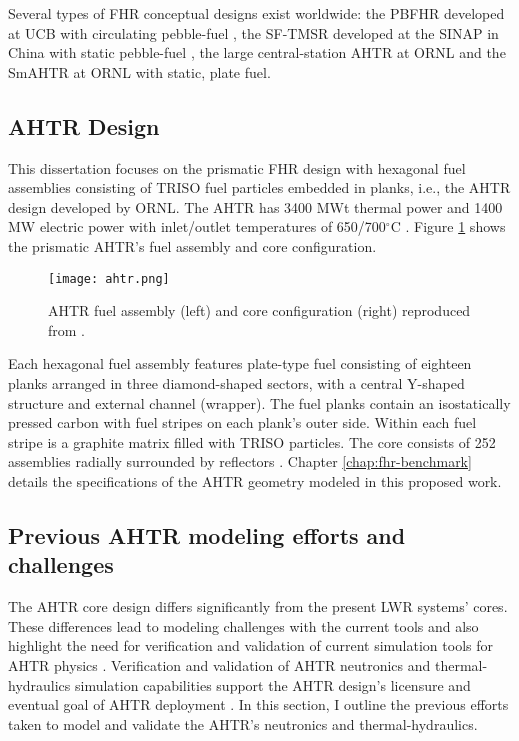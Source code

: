 Several types of \gls{FHR} conceptual designs exist worldwide: the \gls{PBFHR} 
developed at \gls{UCB} with circulating pebble-fuel 
\cite{scarlat_current_2014,krumwiede_three-dimensional_2013}, the \gls{SF-TMSR} 
developed at the \gls{SINAP} in China with static pebble-fuel \cite{liu_preliminary_2016}, 
the large central-station \gls{AHTR} at \gls{ORNL} \cite{holcomb_core_2011, varma_ahtr_2012} and 
the \gls{SmAHTR} at ORNL \cite{greene_pre-conceptual_2010} with static, plate fuel. 

\subsection{\acrlong{AHTR} Design}
This dissertation focuses on the prismatic \gls{FHR} design with hexagonal fuel 
assemblies consisting of \gls{TRISO} fuel particles embedded in planks, i.e., 
the \gls{AHTR} design developed by ORNL. 
The \gls{AHTR} has 3400 MWt thermal power and 1400 MW electric power with
inlet/outlet temperatures of 650/700$^{\circ}$C \cite{varma_ahtr_2012}.  
Figure \ref{fig:ahtr} shows the prismatic AHTR's fuel assembly and core 
configuration.  
\begin{figure}[btp]
    \centering
    \texttt{[image: ahtr.png]} 
    \caption{\acrlong{AHTR} fuel assembly (left) and core configuration (right) 
    reproduced from \cite{ramey_monte_2018}.}
    \label{fig:ahtr}
\end{figure}
Each hexagonal fuel assembly features plate-type fuel consisting of eighteen 
planks arranged in three diamond-shaped sectors, with a central Y-shaped 
structure and external channel (wrapper).
The fuel planks contain an isostatically pressed carbon with fuel stripes 
on each plank's outer side.
Within each fuel stripe is a graphite matrix filled with \gls{TRISO} particles. 
The core consists of 252 assemblies radially surrounded by reflectors
\cite{ramey_monte_2018}. 
Chapter \ref{chap:fhr-benchmark} details the specifications of the AHTR geometry
modeled in this proposed work.

\subsection{Previous AHTR modeling efforts and challenges} 
\label{sec:previous_ahtr}
The \gls{AHTR} core design differs significantly from the present \gls{LWR} 
systems' cores. 
These differences lead to modeling challenges with the current tools and also 
highlight the need for verification and validation of current simulation tools 
for \gls{AHTR} physics \cite{ramey_monte_2018}. 
Verification and validation of \gls{AHTR} neutronics and thermal-hydraulics 
simulation capabilities support the \gls{AHTR} design's licensure and 
eventual goal of \gls{AHTR} deployment 
\cite{rahnema_phenomena_2019,rahnema_current_2015}.
In this section, I outline the previous efforts taken to model and validate 
the \gls{AHTR}'s neutronics and thermal-hydraulics. 

